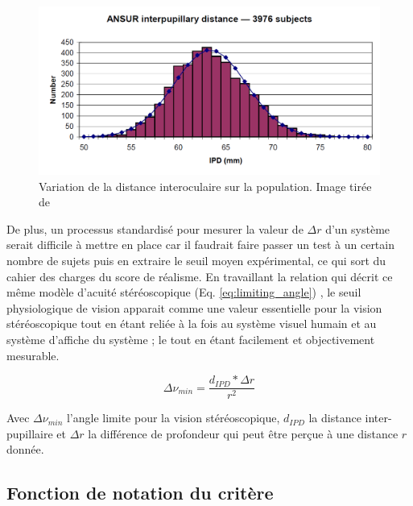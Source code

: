 	\begin{figure}[h]
		\centering
		\includegraphics[scale=.5]{Figures/ANSURIPD}
		\caption{Variation de la distance interoculaire sur la population. Image tirée de \citep{dodgson_variation_2004}}
		\label{fig:variation_dio_population}
	\end{figure}
	
	\par De plus, un processus standardisé pour mesurer la valeur de $\Delta r$ d'un système serait difficile à mettre en place car il faudrait faire passer un test à un certain nombre de sujets puis en extraire le seuil moyen expérimental, ce qui sort du cahier des charges du score de réalisme. En travaillant la relation qui décrit ce même modèle d'acuité stéréoscopique (Eq. \ref{eq:limiting_angle}) \citep{gross_human_2008}, le seuil physiologique de vision apparait comme une valeur essentielle pour la vision stéréoscopique tout en étant reliée à la fois au système visuel humain et au système d'affiche du système ; le tout en étant facilement et objectivement mesurable. 
	
	\begin{equation}	
		\Delta \nu_{min} = \frac{d_{IPD} * \Delta r}{r^2}
		\label{eq:limiting_angle}
	\end{equation}
	
	\par Avec $\Delta \nu_{min}$ l'angle limite pour la vision stéréoscopique, $d_{IPD}$ la distance inter-pupillaire et $\Delta r$ la différence de profondeur qui peut être perçue à une distance $r$ donnée.
	
	\subsection{Fonction de notation du critère}

